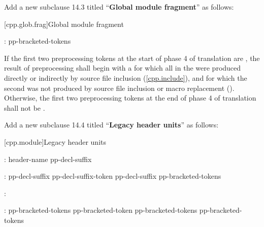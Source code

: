 \begin{after}
\noindent
Add a new subclause 14.3 titled ``\textbf{Global module fragment}'' as follows:

\setcounter{section}{2}
[cpp.glob.frag]{Global module fragment}%
\resetalinea[0]

\begin{std.txt}
\color{addclr}
\begin{bnf}
:\br
   \terminal{;} pp-bracketed-tokens 
\end{bnf}

\alinea
If the first two preprocessing tokens at the start of phase 4 of translation
are  \tcode{;}, the result of preprocessing shall begin with
a  for which all
 in the 
were produced directly or indirectly by source file inclusion
(\ref{cpp.include}), and for which the second 
 was not produced by source file inclusion or
macro replacement ().
Otherwise, the first two preprocessing tokens at the end of phase 4 of
translation shall not be  \tcode{;}.
\end{std.txt}

Add a new subclause 14.4 titled ``\textbf{Legacy header units}'' as follows:

\setcounter{section}{3}
[cpp.module]{Legacy header units}%
\resetalinea[0]

\begin{std.txt}
\color{addclr}
\begin{bnf}
:\br
  \opt{} header-name pp-decl-suffix\opt{} \terminal{;}
\end{bnf}

\begin{bnf}
:\br
  pp-decl-suffix\opt{} pp-decl-suffix-token\br
  pp-decl-suffix\opt{} \terminal{[} pp-bracketed-tokens \terminal{]}
\end{bnf}

\begin{bnf}
:\br
\end{bnf}

\begin{bnf}
:\br
  pp-bracketed-tokens\opt{} pp-bracketed-token\br
  pp-bracketed-tokens\opt{} \terminal{[} pp-bracketed-tokens \terminal{]}
\end{bnf}


\end{std.txt}
\end{after}
